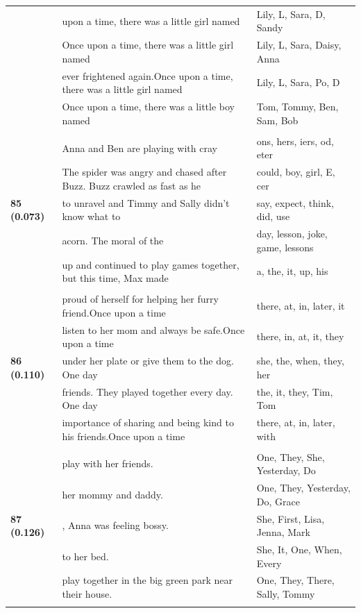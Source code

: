 \documentclass{article}
\theoremstyle{plain}
\theoremstyle{definition}
\theoremstyle{remark}
\begin{document}
\begin{longtable}{|p{}|p{}|p{}|}
& upon a time, there was a little girl named & Lily,  L,  Sara,  D,  Sandy \\
& Once upon a time, there was a little girl named & Lily,  L,  Sara,  Daisy,  Anna \\
& ever frightened again.Once upon a time, there was a little girl named & Lily,  L,  Sara,  Po,  D \\
& Once upon a time, there was a little boy named & Tom,  Tommy,  Ben,  Sam,  Bob \\
& & \\
\multirow{5}{*}{\textbf{85 (0.073)}} & Anna and Ben are playing with cray & ons, hers, iers, od, eter \\
& The spider was angry and chased after Buzz. Buzz crawled as fast as he & could,  boy,  girl,  E, cer \\
& to unravel and Timmy and Sally didn't know what to & say,  expect,  think,  did,  use \\
& acorn. The moral of the & day,  lesson,  joke,  game,  lessons \\
& up and continued to play games together, but this time, Max made & a,  the,  it,  up,  his \\
& & \\
\multirow{5}{*}{\textbf{86 (0.110)}} & proud of herself for helping her furry friend.Once upon a time & there,  at,  in,  later,  it \\
& listen to her mom and always be safe.Once upon a time & there,  in,  at,  it,  they \\
& under her plate or give them to the dog.  One day & she,  the,  when,  they,  her \\
& friends. They played together every day.  One day & the,  it,  they,  Tim,  Tom \\
& importance of sharing and being kind to his friends.Once upon a time & there,  at,  in,  later,  with \\
& & \\
\multirow{5}{*}{\textbf{87 (0.126)}} & play with her friends. & One,  They,  She,  Yesterday,  Do \\
& her mommy and daddy. & One,  They,  Yesterday,  Do,  Grace \\
& , Anna was feeling bossy. & She,  First,  Lisa,  Jenna,  Mark \\
& to her bed. & She,  It,  One,  When,  Every \\
& play together in the big green park near their house. & One,  They,  There,  Sally,  Tommy \\
& & \\

\end{longtable}
\end{document}
